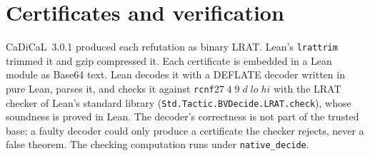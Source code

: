 \documentclass[11pt]{amsart}
\theoremstyle{definition}
\begin{document}
\section{Certificates and verification}

CaDiCaL~3.0.1 produced each refutation as binary LRAT. Lean's
\texttt{lrattrim} trimmed it and gzip compressed it. Each certificate
is embedded in a Lean module as Base64 text. Lean decodes it with a
DEFLATE decoder written in pure Lean, parses it, and checks it against
\texttt{rcnf}\;$27\;4\;9\;d\;lo\;hi$ with the LRAT checker of Lean's
standard library (\texttt{Std.Tactic.BVDecide.LRAT.check}), whose
soundness is proved in Lean. The decoder's correctness is not part of
the trusted base: a faulty decoder could only produce a certificate
the checker rejects, never a false theorem. The checking computation
runs under \texttt{native\_decide}.
\end{document}
